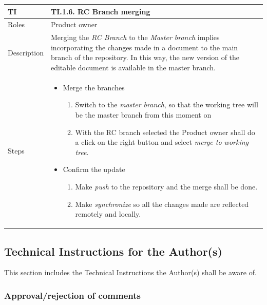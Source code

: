 \documentclass{template/openetcs_article}
\begin{document}
\begin{flushleft}
\tablefirsthead{}
\tablehead{}
\tabletail{}
\tablelasttail{}
\begin{supertabular}{|m{2cm}|m{13cm}|}
\hline
{}
TI & 
TI.1.6. RC Branch merging
\\\hline
Roles &
Product owner
\\\hline
Description &
Merging the {\it RC Branch} to the {\it Master branch} implies incorporating the changes made in a document to the main branch of the repository. In this way, the new version of the editable document is available in the master branch.
\\\hline
Steps &
\begin{itemize}
\item Merge the branches 
\begin{enumerate}
\item Switch to the {\it master branch}, so that the working tree will be the master branch from this moment on
\item With the RC branch selected the Product owner shall do a click on the right button and select {\it merge to working tree}.
\end{enumerate}
\item Confirm the update
\begin{enumerate}
\item Make {\it push} to the repository and the merge shall be done.
\item Make {\it synchronize} so all the changes made are reflected remotely and locally.
\end{enumerate}
\end{itemize}
\\\hline
\end{supertabular}
\end{flushleft}

\subsection{Technical Instructions for the Author(s)}

This section includes the Technical Instructions the Author(s) shall be aware of.

\subsubsection{Approval/rejection of comments}
\end{document}
